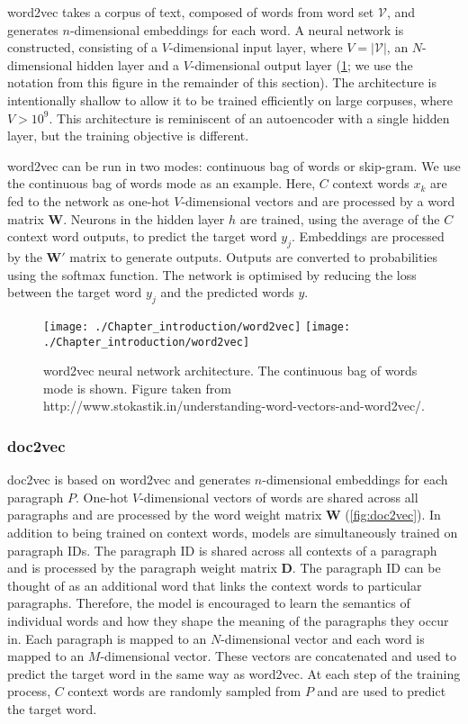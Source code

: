 word2vec \cite{Mikolov} takes a corpus of text, composed of words from word set $\mathcal{V}$, and generates $n$-dimensional embeddings for each word. A neural network is constructed, consisting of a $V$-dimensional input layer, where $V = |\mathcal{V}|$, an $N$-dimensional hidden layer and a $V$-dimensional output layer (\ref{fig:word2vec}; we use the notation from this figure in the remainder of this section). The architecture is intentionally shallow to allow it to be trained efficiently on large corpuses, where $V > 10^9$. This architecture is reminiscent of an autoencoder with a single hidden layer, but the training objective is different.

word2vec can be run in two modes: continuous bag of words or skip-gram. We use the continuous bag of words mode as an example. Here, $C$ context words $x_k$ are fed to the network as one-hot $V$-dimensional vectors and are processed by a word matrix $\mathbf{W}$. Neurons in the hidden layer $h$ are trained, using the average of the $C$ context word outputs, to predict the target word $y_j$. Embeddings are processed by the $\mathbf{W}'$ matrix to generate outputs. Outputs are converted to probabilities using the softmax function. The network is optimised by reducing the loss between the target word $y_j$ and the predicted words $y$.

\begin{figure}[!hbt]
    \centering
    \ifredact
        \texttt{[image: ./Chapter\_introduction/word2vec]}
    \else
        \texttt{[image: ./Chapter\_introduction/word2vec]}
    \fi
    \caption{%
        word2vec neural network architecture.
        The continuous bag of words mode is shown.
        Figure taken from http://www.stokastik.in/understanding-word-vectors-and-word2vec/.
    }
    \label{fig:word2vec}
\end{figure}

\subsubsection{doc2vec}

doc2vec \cite{Le2014} is based on word2vec and generates $n$-dimensional embeddings for each paragraph $P$. One-hot $V$-dimensional vectors of words are shared across all paragraphs and are processed by the word weight matrix $\mathbf{W}$ (\ref{fig:doc2vec}). In addition to being trained on context words, models are simultaneously trained on paragraph IDs. The paragraph ID is shared across all contexts of a paragraph and is processed by the paragraph weight matrix $\mathbf{D}$. The paragraph ID can be thought of as an additional word that links the context words to particular paragraphs. Therefore, the model is encouraged to learn the semantics of individual words and how they shape the meaning of the paragraphs they occur in. Each paragraph is mapped to an $N$-dimensional vector and each word is mapped to an $M$-dimensional vector. These vectors are concatenated and used to predict the target word in the same way as word2vec. At each step of the training process, $C$ context words are randomly sampled from $P$ and are used to predict the target word.

